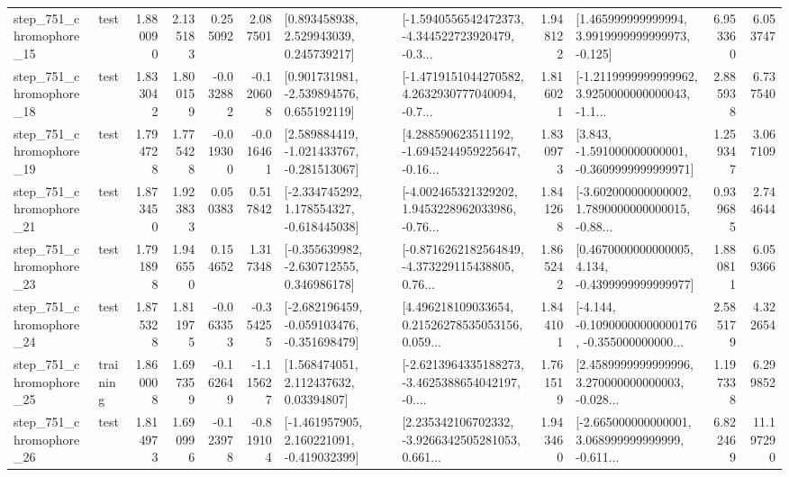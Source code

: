 \begin{tabular}{llrrrrllrlrr}
  step\_751\_chromophore\_15 &      test &      1.880090 &    2.135183 &      0.255092 &  2.087501 &     [0.893458938, 2.529943039, 0.245739217] &  [-1.5940556542472373, -4.344522723920479, -0.3... &       1.948122 &    [1.465999999999994, 3.9919999999999973, -0.125] &            6.953360 &          6.053747 \\
  step\_751\_chromophore\_18 &      test &      1.833042 &    1.800159 &     -0.032882 & -0.120608 &    [0.901731981, -2.539894576, 0.655192119] &  [-1.4719151044270582, 4.2632930777040094, -0.7... &       1.816021 &  [-1.2119999999999962, 3.9250000000000043, -1.1... &            2.885938 &          6.737540 \\
  step\_751\_chromophore\_19 &      test &      1.794728 &    1.775428 &     -0.019300 & -0.016461 &   [2.589884419, -1.021433767, -0.281513067] &  [4.288590623511192, -1.6945244959225647, -0.16... &       1.830973 &   [3.843, -1.591000000000001, -0.3609999999999971] &            1.259347 &          3.067109 \\
  step\_751\_chromophore\_21 &      test &      1.873450 &    1.923833 &      0.050383 &  0.517842 &   [-2.334745292, 1.178554327, -0.618445038] &  [-4.002465321329202, 1.9453228962033986, -0.76... &       1.841268 &  [-3.602000000000002, 1.7890000000000015, -0.88... &            0.939685 &          2.744644 \\
  step\_751\_chromophore\_23 &      test &      1.791898 &    1.946550 &      0.154652 &  1.317348 &   [-0.355639982, -2.630712555, 0.346986178] &  [-0.8716262182564849, -4.373229115438805, 0.76... &       1.865242 &   [0.4670000000000005, 4.134, -0.4399999999999977] &            1.880811 &          6.059366 \\
  step\_751\_chromophore\_24 &      test &      1.875328 &    1.811975 &     -0.063353 & -0.354255 &  [-2.682196459, -0.059103476, -0.351698479] &  [4.496218109033654, 0.21526278535053156, 0.059... &       1.844101 &  [-4.144, -0.10900000000000176, -0.355000000000... &            2.585179 &          4.322654 \\
  step\_751\_chromophore\_25 &  training &      1.860008 &    1.697359 &     -0.162649 & -1.115627 &      [1.568474051, 2.112437632, 0.03394807] &  [-2.6213964335188273, -3.4625388654042197, -0.... &       1.761519 &  [2.4589999999999996, 3.270000000000003, -0.028... &            1.197338 &          6.299852 \\
  step\_751\_chromophore\_26 &      test &      1.814973 &    1.690996 &     -0.123978 & -0.819104 &   [-1.461957905, 2.160221091, -0.419032399] &  [2.235342106702332, -3.9266342505281053, 0.661... &       1.943460 &  [-2.665000000000001, 3.068999999999999, -0.611... &            6.822469 &         11.197290 \\

\end{tabular}
